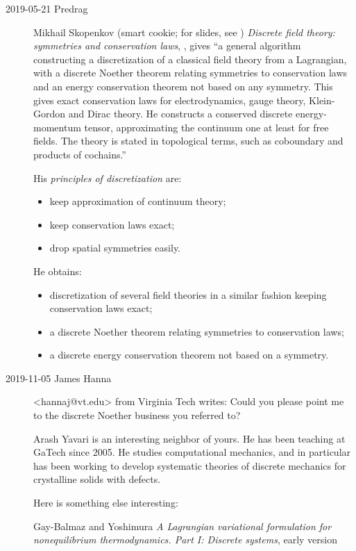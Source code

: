 \begin{description}
\item[2019-05-21 Predrag]
{Mikhail Skopenkov}
(smart cookie; for slides, see )
{\em Discrete field theory: symmetries and conservation laws},
, gives ``a general algorithm constructing a discretization
of a classical field theory from a Lagrangian, with a discrete Noether
theorem relating symmetries to conservation laws and an energy conservation
theorem not based on any symmetry. This gives exact conservation laws for
electrodynamics, gauge theory, Klein-Gordon
and Dirac theory. He constructs a conserved discrete
energy-momentum tensor, approximating the continuum one at least for free
fields. The theory is stated in topological terms, such as coboundary and
products of cochains.''

His \emph{principles of discretization} are:
\begin{itemize}
\item keep approximation of continuum theory;
\item keep conservation laws exact;
\item drop spatial symmetries easily.
\end{itemize}
He obtains:
\begin{itemize}
\item
    discretization of several field theories in a similar fashion keeping
    conservation laws exact;
\item
    a discrete Noether theorem relating symmetries to conservation laws;
\item
    a discrete energy conservation theorem not based on a symmetry.
\end{itemize}

\item[2019-11-05 James Hanna] <hannaj@vt.edu> from
 {Virginia Tech} writes:
Could you please point me to the discrete Noether business you referred to?

{Arash Yavari} is an interesting neighbor of yours.
He has been teaching at GaTech since 2005. He studies computational mechanics, and
in particular has been working to develop systematic theories of discrete
mechanics for crystalline solids with defects.

Here is something else interesting:

Gay-Balmaz and Yoshimura {\em A {Lagrangian} variational
formulation for nonequilibrium thermodynamics. {Part I: Discrete} systems}, early
version 


\end{description}
